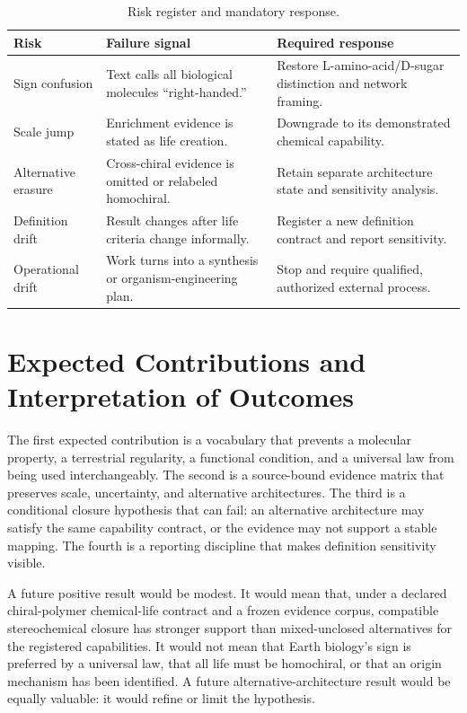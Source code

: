 \documentclass[conference]{IEEEtran}
\begin{document}
\begin{table}[!t]
\caption{Risk register and mandatory response.}
\label{tab:risks}
\centering
\renewcommand{\arraystretch}{1.15}
\begin{tabular}{|P{0.22\columnwidth}|P{0.20\columnwidth}|P{0.28\columnwidth}|}
\hline
\textbf{Risk} & \textbf{Failure signal} & \textbf{Required response} \\
\hline
Sign confusion & Text calls all biological molecules ``right-handed.'' & Restore L-amino-acid/D-sugar distinction and network framing. \\
\hline
Scale jump & Enrichment evidence is stated as life creation. & Downgrade to its demonstrated chemical capability. \\
\hline
Alternative erasure & Cross-chiral evidence is omitted or relabeled homochiral. & Retain separate architecture state and sensitivity analysis. \\
\hline
Definition drift & Result changes after life criteria change informally. & Register a new definition contract and report sensitivity. \\
\hline
Operational drift & Work turns into a synthesis or organism-engineering plan. & Stop and require qualified, authorized external process. \\
\hline
\end{tabular}
\end{table}

\section{Expected Contributions and Interpretation of Outcomes}

The first expected contribution is a vocabulary that prevents a molecular property, a terrestrial regularity, a functional condition, and a universal law from being used interchangeably. The second is a source-bound evidence matrix that preserves scale, uncertainty, and alternative architectures. The third is a conditional closure hypothesis that can fail: an alternative architecture may satisfy the same capability contract, or the evidence may not support a stable mapping. The fourth is a reporting discipline that makes definition sensitivity visible.

A future positive result would be modest. It would mean that, under a declared chiral-polymer chemical-life contract and a frozen evidence corpus, compatible stereochemical closure has stronger support than mixed-unclosed alternatives for the registered capabilities. It would not mean that Earth biology's sign is preferred by a universal law, that all life must be homochiral, or that an origin mechanism has been identified. A future alternative-architecture result would be equally valuable: it would refine or limit the hypothesis.
\end{document}
